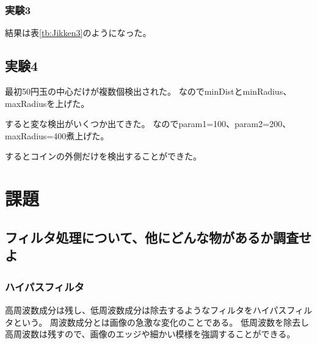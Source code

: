 \documentclass{jlreq}
\begin{document}
\subsubsection{実験3}
結果は表\ref{tb:Jikken3}のようになった。
\begin{table}[htbp]
	\centering
	\caption{実験3の結果}
\end{table}

\subsection{実験4}
最初50円玉の中心だけが複数個検出された。
なのでminDistとminRadius、maxRadiusを上げた。

すると変な検出がいくつか出てきた。
なのでparam1=100、param2=200、maxRadius=400煮上げた。

するとコインの外側だけを検出することができた。

\section{課題}
\subsection{フィルタ処理について、他にどんな物があるか調査せよ}
\subsubsection{ハイパスフィルタ\textsuperscript{\cite{Highpath}}}
高周波数成分は残し、低周波数成分は除去するようなフィルタをハイパスフィルタという。
周波数成分とは画像の急激な変化のことである。
低周波数を除去し高周波数は残すので、画像のエッジや細かい模様を強調することができる。
\end{document}
